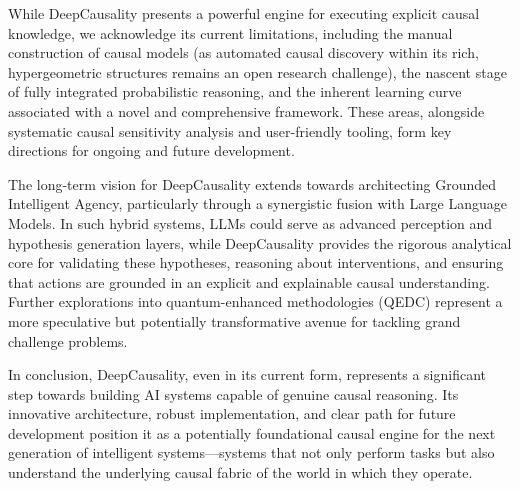 While DeepCausality presents a powerful engine for executing explicit causal knowledge, we acknowledge its current limitations, including the manual construction of causal models (as automated causal discovery within its rich, hypergeometric structures remains an open research challenge), the nascent stage of fully integrated probabilistic reasoning, and the inherent learning curve associated with a novel and comprehensive framework. These areas, alongside systematic causal sensitivity analysis and user-friendly tooling, form key directions for ongoing and future development.

The long-term vision for DeepCausality extends towards architecting Grounded Intelligent Agency, particularly through a synergistic fusion with Large Language Models. In such hybrid systems, LLMs could serve as advanced perception and hypothesis generation layers, while DeepCausality provides the rigorous analytical core for validating these hypotheses, reasoning about interventions, and ensuring that actions are grounded in an explicit and explainable causal understanding. Further explorations into quantum-enhanced methodologies (QEDC) represent a more speculative but potentially transformative avenue for tackling grand challenge problems.

In conclusion, DeepCausality, even in its current form, represents a significant step towards building AI systems capable of genuine causal reasoning. Its innovative architecture, robust implementation, and clear path for future development position it as a potentially foundational causal engine for the next generation of intelligent systems—systems that not only perform tasks but also understand the underlying causal fabric of the world in which they operate.